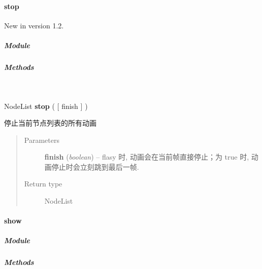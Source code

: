 \documentclass[letterpaper,10pt,english]{sphinxmanual}
\begin{document}
\paragraph{stop}
\label{api/core/node/stop:stop}\label{api/core/node/stop::doc}New in version 1.2.

\subparagraph{Module}
\label{api/core/node/stop:module}\begin{quote}

{\hyperref[api/core/node/index:module-Node]{}}
\end{quote}


\subparagraph{Methods}
\label{api/core/node/stop:methods}

\begin{fulllineitems}
\label{api/core/node/stop:Node.stop}~
\begin{DUlineblock}{0em}
\item[] NodeList \textbf{stop} ( {[} finish {]} )
\item[] 停止当前节点列表的所有动画
\end{DUlineblock}
\begin{quote}\begin{description}
\item[{Parameters}] \leavevmode
\textbf{finish} (\emph{boolean}) -- flasy 时, 动画会在当前帧直接停止；为 true 时, 动画停止时会立刻跳到最后一帧.

\item[{Return type}] \leavevmode
NodeList

\end{description}\end{quote}

\end{fulllineitems}



\paragraph{show}
\label{api/core/node/show::doc}\label{api/core/node/show:show}

\subparagraph{Module}
\label{api/core/node/show:module}\begin{quote}

{\hyperref[api/core/node/index:module-Node]{}}
\end{quote}


\subparagraph{Methods}
\label{api/core/node/show:methods}
\end{document}
